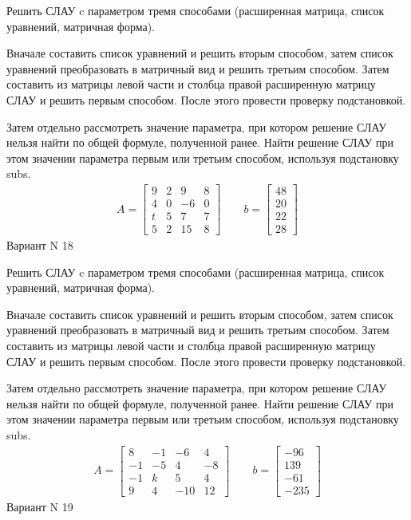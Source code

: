 \documentclass[11pt]{report}
\begin{document}
Решить СЛАУ c параметром тремя способами (расширенная матрица, список уравнений, матричная форма).

Вначале составить список уравнений и решить вторым способом,
затем список уравнений преобразовать в матричный вид и решить третьим способом.
Затем составить из матрицы левой части и столбца правой расширенную матрицу СЛАУ и решить первым способом.
После этого провести проверку подстановкой.

Затем отдельно рассмотреть значение параметра, при котором решение СЛАУ нельзя найти по общей формуле,
полученной ранее.
Найти решение СЛАУ при этом значении параметра первым или третьим способом, используя подстановку subs.
\begin{align*}
    A = \left[\begin{matrix}9 & 2 & 9 & 8\\4 & 0 & -6 & 0\\t & 5 & 7 & 7\\5 & 2 & 15 & 8\end{matrix}\right]
\qquad b = \left[\begin{matrix}48\\20\\22\\28\end{matrix}\right]
\end{align*}
\newpage
Вариант N 18


Решить СЛАУ c параметром тремя способами (расширенная матрица, список уравнений, матричная форма).

Вначале составить список уравнений и решить вторым способом,
затем список уравнений преобразовать в матричный вид и решить третьим способом.
Затем составить из матрицы левой части и столбца правой расширенную матрицу СЛАУ и решить первым способом.
После этого провести проверку подстановкой.

Затем отдельно рассмотреть значение параметра, при котором решение СЛАУ нельзя найти по общей формуле,
полученной ранее.
Найти решение СЛАУ при этом значении параметра первым или третьим способом, используя подстановку subs.
\begin{align*}
    A = \left[\begin{matrix}8 & -1 & -6 & 4\\-1 & -5 & 4 & -8\\-1 & k & 5 & 4\\9 & 4 & -10 & 12\end{matrix}\right]
\qquad b = \left[\begin{matrix}-96\\139\\-61\\-235\end{matrix}\right]
\end{align*}
\newpage
Вариант N 19
\end{document}
